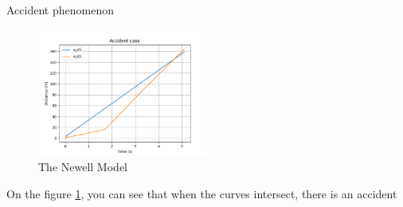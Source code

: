 \documentclass{beamer}
\begin{document}
\begin{frame}{Accident phenomenon}
    \begin{figure}
    	\includegraphics[width=0.5\textwidth]{1W2_Acc2.png}
    	\caption{The Newell Model}
    	\label{fig:ACC}
    \end{figure}
    \begin{block}{}
    	On the figure \ref{fig:ACC}, you can see that when the curves intersect, there is an accident
    \end{block}
\end{frame}
\end{document}
